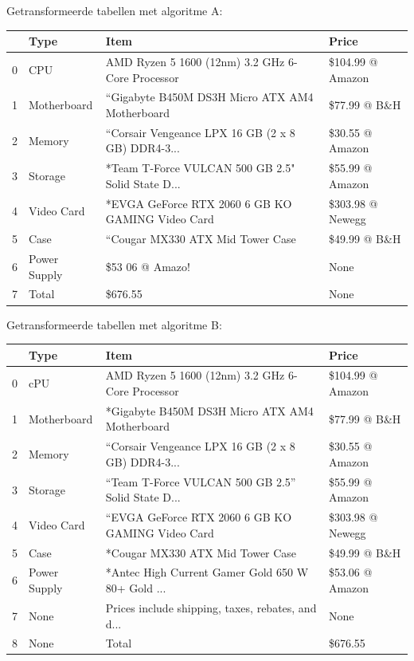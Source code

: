Getransformeerde tabellen met algoritme A:

\begin{tabular}{llll}
\toprule
{} &          Type &                                               Item &             Price \\
\midrule
0 &           CPU &   AMD Ryzen 5 1600 (12nm) 3.2 GHz 6-Core Processor &  \$104.99 @ Amazon \\
1 &   Motherboard &     “Gigabyte B450M DS3H Micro ATX AM4 Motherboard &      \$77.99 @ B\&H \\
2 &        Memory &  “Corsair Vengeance LPX 16 GB (2 x 8 GB) DDR4-3... &   \$30.55 @ Amazon \\
3 &       Storage &  *Team T-Force VULCAN 500 GB 2.5" Solid State D... &   \$55.99 @ Amazon \\
4 &    Video Card &   *EVGA GeForce RTX 2060 6 GB KO GAMING Video Card &  \$303.98 @ Newegg \\
5 &          Case &                   “Cougar MX330 ATX Mid Tower Case &      \$49.99 @ B\&H \\
6 &  Power Supply &                                    \$53 06 @ Amazo! &              None \\
7 &         Total &                                            \$676.55 &              None \\
\bottomrule
\end{tabular}

Getransformeerde tabellen met algoritme B:

\begin{tabular}{llll}
\toprule
{} &          Type &                                               Item &             Price \\
\midrule
0 &           cPU &   AMD Ryzen 5 1600 (12nm) 3.2 GHz 6-Core Processor &  \$104.99 @ Amazon \\
1 &   Motherboard &     *Gigabyte B450M DS3H Micro ATX AM4 Motherboard &      \$77.99 @ B\&H \\
2 &        Memory &  “Corsair Vengeance LPX 16 GB (2 x 8 GB) DDR4-3... &   \$30.55 @ Amazon \\
3 &       Storage &  “Team T-Force VULCAN 500 GB 2.5” Solid State D... &   \$55.99 @ Amazon \\
4 &    Video Card &   “EVGA GeForce RTX 2060 6 GB KO GAMING Video Card &  \$303.98 @ Newegg \\
5 &          Case &                   *Cougar MX330 ATX Mid Tower Case &      \$49.99 @ B\&H \\
6 &  Power Supply &  *Antec High Current Gamer Gold 650 W 80+ Gold ... &   \$53.06 @ Amazon \\
7 &          None &  Prices include shipping, taxes, rebates, and d... &              None \\
8 &          None &                                              Total &           \$676.55 \\
\bottomrule
\end{tabular}
